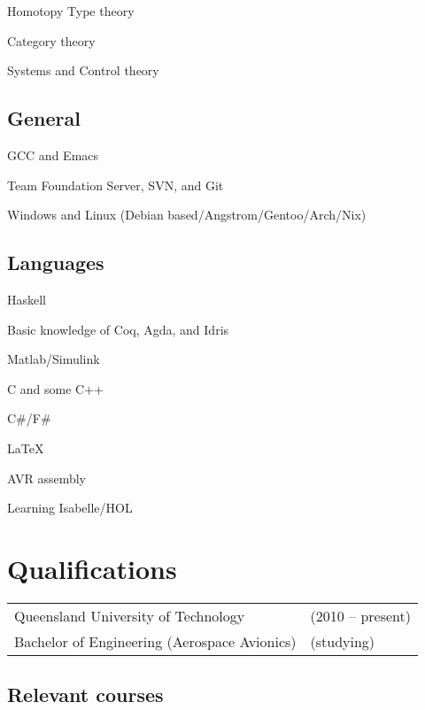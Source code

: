 \documentclass[letterpaper]{article}
\renewenvironment{itemize}{
  \begin{list}{}{
    \setlength{\leftmargin}{1.5em}
  }
}{
  \end{list}
}
\begin{document}
\begin{itemize}
\item Homotopy Type theory
\item Category theory
\item Systems and Control theory
\end{itemize}

\subsection*{General}

\begin{itemize}
\item GCC and Emacs
\item Team Foundation Server, SVN, and Git
\item Windows and Linux (Debian based/Angstrom/Gentoo/Arch/Nix)
\end{itemize}

\subsection*{Languages}

\begin{itemize}
\item Haskell
\item Basic knowledge of Coq, Agda, and Idris
\item Matlab/Simulink
\item C and some C++
\item C\#/F\#
\item LaTeX
\item AVR assembly
\item Learning Isabelle/HOL
\end{itemize}

\section*{Qualifications}

\begin{minipage}{0.45\linewidth}
  \begin{tabular}{ll}
    Queensland University of Technology & (2010 – present) \\
    Bachelor of Engineering (Aerospace Avionics) & (studying) \\
  \end{tabular}
\end{minipage}

\subsection*{Relevant courses}
\end{document}
